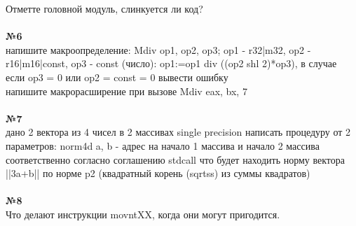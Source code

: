 \documentclass[a4paper,10pt]{article}
\begin{document}
Отметте головной модуль, слинкуется ли код? \\
\vspace{0.3cm} \\
\textbf{№6} \\
напишите макроопределение: Mdiv op1, op2, op3; op1 - r32|m32, op2 - r16|m16|const, op3 - const (число): op1:=op1 div ((op2 shl 2)*op3), в случае если op3 = 0 или op2 = const = 0 вывести ошибку  \\ напишите макрорасширение при вызове Mdiv eax, bx, 7 \\
\vspace{0.3cm} \\
\textbf{№7} \\
дано 2 вектора из 4 чисел в 2 массивах single precision написать процедуру от 2 параметров: norm4d a, b - адрес на начало 1 массива и начало 2 массива соответственно согласно соглашению stdcall что будет находить норму вектора ||3a+b|| по норме p2 (квадратный корень (sqrtss) из суммы квадратов) \\
\vspace{0.3cm} \\
\textbf{№8} \\
Что делают инструкции movntXX, когда они могут пригодится.
\end{document}
